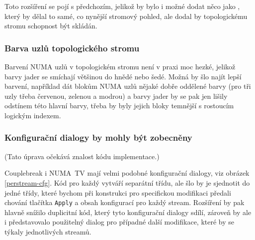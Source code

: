 Toto rozšíření se pojí s předchozím, jelikož by bylo i možné dodat něco jako , který by dělal to samé, co nynější stromový pohled, ale dodal by topologickému stromu schopnost být skládán.

\subsubsection*{Barva uzlů topologického stromu}
Barvení NUMA uzlů v topologickém stromu není v praxi moc hezké, jelikož barvy jader se smíchají většinou do hnědé nebo šedé. Možná by šlo najít lepší barvení, například dát blokům NUMA uzlů nějaké dobře oddělené barvy (pro tři uzly třeba červenou, zelenou a modrou) a barvy jader by se pak jen lišily odstínem této hlavní barvy, třeba by byly jejich bloky temnější s rostoucím logickým indexem.

\subsubsection*{Konfigurační dialogy by mohly být zobecněny}
(Tato úprava očekává znalost kódu implementace.)

Couplebreak i NUMA~TV mají velmi podobné konfigurační dialogy, viz obrázek \ref{perstream-cfg}. Kód pro každý vytváří separátní třídu, ale šlo by je sjednotit do jedné třídy, které bychom při konstrukci pro specifickou modifikaci předali chování tlačítka \texttt{Apply} a obsah konfigurací pro každý stream. Rozšíření by pak hlavně snížilo duplicitní kód, který tyto konfigurační dialogy sdílí, zároveň by ale i představovalo použitelný dialog pro případné další modifikace, které by se týkaly jednotlivých streamů.


